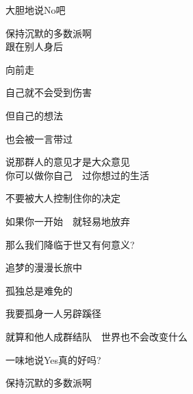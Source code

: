 大胆地说No吧

保持沉默的多数派啊
\\

跟在别人身后

向前走

自己就不会受到伤害

但自己的想法

也会被一言带过

说那群人的意见才是大众意见
\\

你可以做你自己　过你想过的生活

不要被大人控制住你的决定

如果你一开始　就轻易地放弃

那么我们降临于世又有何意义?

追梦的漫漫长旅中

孤独总是难免的

我要孤身一人另辟蹊径

就算和他人成群结队　世界也不会改变什么

一味地说Yes真的好吗?

保持沉默的多数派啊
\\　